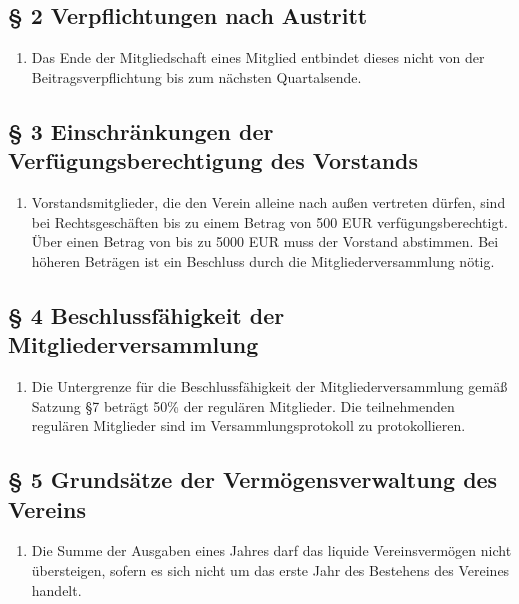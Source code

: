 \documentclass[10pt,a4paper]{article}
\begin{document}
\subsection*{§ 2 Verpflichtungen nach Austritt}
\begin{enumerate}
\item Das Ende der Mitgliedschaft eines Mitglied entbindet dieses nicht von der
	Beitragsverpflichtung bis zum nächsten Quartalsende.
\end{enumerate}

\subsection*{§ 3 Einschränkungen der Verfügungsberechtigung des Vorstands}
\begin{enumerate}
\item Vorstandsmitglieder, die den Verein alleine nach außen vertreten
    dürfen, sind bei Rechtsgeschäften bis zu einem Betrag von 500 EUR
    verfügungsberechtigt. Über einen Betrag von bis zu 5000 EUR muss der
    Vorstand abstimmen. Bei höheren Beträgen ist ein Beschluss durch die
    Mitgliederversammlung nötig.
\end{enumerate}

\subsection*{§ 4 Beschlussfähigkeit der Mitgliederversammlung}
\begin{enumerate}
\item Die Untergrenze für die Beschlussfähigkeit der Mitgliederversammlung
	gemäß Satzung §7 beträgt 50\% der regulären Mitglieder. Die teilnehmenden
	regulären Mitglieder sind im Versammlungsprotokoll zu protokollieren.
\end{enumerate}

\subsection*{§ 5 Grundsätze der Vermögensverwaltung des Vereins}
\begin{enumerate}
\item Die Summe der Ausgaben eines Jahres darf das liquide Vereinsvermögen
	nicht übersteigen, sofern es sich nicht um das erste Jahr des Bestehens des Vereines handelt.
\end{enumerate}
\end{document}
